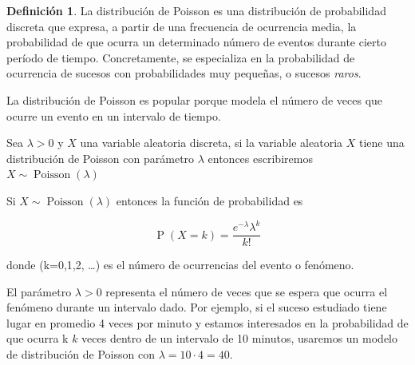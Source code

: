\documentclass[]{book}
\theoremstyle{plain}
\theoremstyle{definition}
\newtheorem{definition}[theorem]{Definición}
\theoremstyle{definition} %
\begin{document}
\begin{definition}
  La distribución de Poisson es una distribución de probabilidad discreta
que expresa, a partir de una frecuencia de ocurrencia media, la
probabilidad de que ocurra un determinado número de eventos durante
cierto período de tiempo. Concretamente, se especializa en la
probabilidad de ocurrencia de sucesos con probabilidades muy pequeñas, o
sucesos \emph{raros}.

La distribución de Poisson es popular porque modela el número de veces
que ocurre un evento en un intervalo de tiempo.

Sea \(\displaystyle \lambda >0\) y \(X\) una variable aleatoria
discreta, si la variable aleatoria \(X\) tiene una distribución de
Poisson con parámetro \(\lambda\) entonces escribiremos
\(\displaystyle X\sim \operatorname {Poisson} (\lambda )\)

Si \(\displaystyle X\sim \operatorname {Poisson} (\lambda )\) entonces
la función de probabilidad es

\[\displaystyle \operatorname {P} (X=k)={\frac {e^{-\lambda }\lambda ^{k}}{k!}}\]

donde (k=0,1,2, \dots ) es el número de ocurrencias del evento o
fenómeno.

El parámetro \(\displaystyle \lambda >0\) representa el número de veces
que se espera que ocurra el fenómeno durante un intervalo dado. Por
ejemplo, si el suceso estudiado tiene lugar en promedio 4 veces por
minuto y estamos interesados en la probabilidad de que ocurra k \(k\)
veces dentro de un intervalo de 10 minutos, usaremos un modelo de
distribución de Poisson con \(\lambda = 10\cdot 4 = 40\).
\end{definition}
\end{document}
